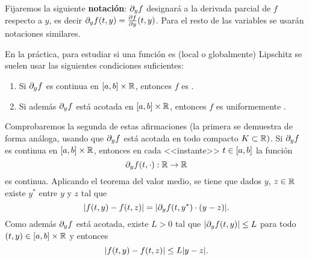 Fijaremos la siguiente
\textbf{notación}: $\dy f$ designará a la derivada parcial de $f$
respecto a $y$, es decir $\dy f(\tt,y) = \frac{\partial f}{\partial
  \yy}(\tt,y)$. Para el resto de las variables se usarán notaciones
similares.
\begin{remark}
  En la práctica, para estudiar si una función es (local o
  globalmente) Lipschitz se suelen usar las siguientes condiciones
  suficientes:
  \begin{enumerate}
  \item Si $\dy f$ es continua en $[\ta,\tb]\times\Rset$, entonces $f$
    es \locLipschitz.
  \item Si además $\dy f$ está acotada en
    $[\ta,\tb]\times\Rset$, entonces $f$ es uniformemente
    \globLipschitz.
  \end{enumerate}
  Comprobaremos la segunda de estas afirmaciones (la primera se
  demuestra de forma análoga, usando que $\dy f$ está acotada
  en todo compacto $K\subset\Rset)$.
  Si $\dy f$ es continua en $[\ta,\tb]\times\Rset$, entonces en cada
  <<instante>> $t\in[\ta,\tb]$ la función
  $$\dy f(t,\cdot):\Rset \to \Rset$$
  es continua. Aplicando el teorema del valor medio, se tiene que
  dados $y$, $z\in\Rset$ existe $y^*$ entre $y$ y $z$ tal que
  \begin{equation*}
    |f(\tt,y)-f(\tt,z)| = |\dy f(\tt,y^*) \cdot (y-z)|.
  \end{equation*}
  Como además  $\dy f$ está acotada, existe $L>0$ tal que $|\dy
  f(\tt,y)|\le L$ para todo $(\tt,y)\in [\ta,\tb]\times\Rset$ y
  entonces
  \begin{equation*}
    |f(\tt,y) - f(\tt,z)| \le L |y-z|.
  \end{equation*}
\end{remark}



